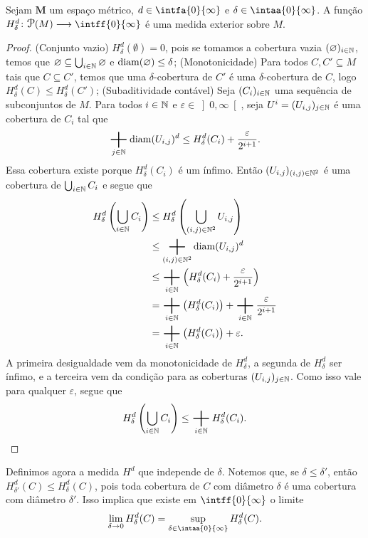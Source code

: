 \begin{prop}
Sejam $\bm M$ um espaço métrico, $d \in \intfa{0}{\infty}$ e $\delta \in \intaa{0}{\infty}$. A função $H^d_\delta\colon \p(M) \to \intff{0}{\infty}$ é uma medida exterior sobre $M$.
\end{prop}
\begin{proof}
(Conjunto vazio) $H^d_\delta(\emptyset)=0$, pois se tomamos a cobertura vazia $(\varnothing)_{i \in \mathbb{N}}$, temos que $\varnothing \subseteq \bigcup_{i \in \mathbb{N}} \varnothing$ e $\operatorname{diam}(\varnothing)\leq \delta$; (Monotonicidade) Para todos $C,C' \subseteq M$ tais que $C \subseteq C'$, temos que uma $\delta$-cobertura de $C'$ é uma $\delta$-cobertura de $C$, logo $H^d_\delta(C) \leq H^d_\delta(C')$; (Subaditividade contável) Seja $(C_i)_{i \in \mathbb{N}}$ uma sequência de subconjuntos de $M$. Para todos $i \in \mathbb{N}$ e $\varepsilon \in \left]0,\infty\right[$, seja $U^i=(U_{i,j})_{j \in \mathbb{N}}$ é uma cobertura de $C_i$ tal que
	\begin{equation*}
	\sum_{j \in \N} \diam(U_{i,j})^d \leq H^d_\delta(C_i) + \frac{\varepsilon}{2^{i+1}}.
	\end{equation*}
Essa cobertura existe porque $H^d_\delta(C_i)$ é um ínfimo. Então $(U_{i,j})_{(i,j) \in \mathbb{N}^2}$ é uma cobertura de $\bigcup_{i \in \mathbb{N}} C_i$ e segue que
	\begin{align*}
	H^d_\delta\left( \bigcup_{i \in \N} C_i \right) &\leq H^d_\delta\left( \bigcup_{(i,j) \in \N^2} U_{i,j} \right) \\
		&\leq \sum_{(i,j) \in \N^2} \diam(U_{i,j})^d \\
		&\leq \sum_{i \in \N} \left( H^d_\delta(C_i) + \frac{\varepsilon}{2^{i+1}} \right) \\
		&= \sum_{i \in \N} \left( H^d_\delta(C_i)\right) + \sum_{i \in \N}\frac{\varepsilon}{2^{i+1}} \\
		&= \sum_{i \in \N} \left( H^d_\delta(C_i)\right) + \varepsilon.
	\end{align*}
A primeira desigualdade vem da monotonicidade de $H^d_\delta$, a segunda de $H^d_\delta$ ser ínfimo, e a terceira vem da condição para as coberturas $(U_{i,j})_{j \in \mathbb{N}}$. Como isso vale para qualquer $\varepsilon$, segue que
	\begin{equation*}
	H^d_\delta\left( \bigcup_{i \in \N} C_i \right) \leq \sum_{i \in \N} H^d_\delta(C_i). \qedhere
	\end{equation*}
\end{proof}


Definimos agora a medida $H^d$ que independe de $\delta$. Notemos que, se $\delta \leq \delta'$, então $H^d_{\delta'}(C) \leq H^d_\delta(C)$, pois toda cobertura de $C$ com diâmetro $\delta$ é uma cobertura com diâmetro $\delta'$. Isso implica que existe em $\intff{0}{\infty}$ o limite
	\begin{equation*}
	\lim_{\delta \conv 0} H^d_\delta(C) = \sup_{\delta \in \intaa{0}{\infty}} H^d_\delta(C).
	\end{equation*}

